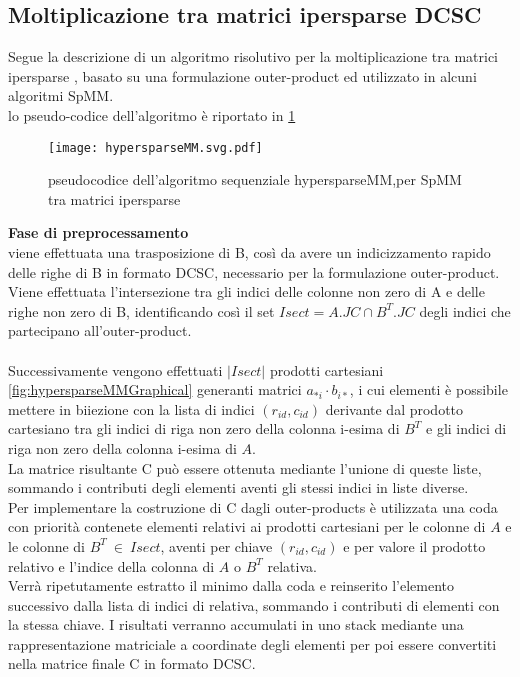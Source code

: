 \subsection{Moltiplicazione tra matrici ipersparse DCSC}
\label{ssec:hypersparseMM}
Segue la descrizione di un algoritmo risolutivo per la moltiplicazione tra matrici
ipersparse \cite{2dNewIdeas}, basato su una formulazione outer-product ed
utilizzato in alcuni algoritmi SpMM.\\
lo pseudo-codice dell'algoritmo è riportato in \ref{figCode:hypersparseMM} 
\begin{figure}[H]
  \centering \texttt{[image: hypersparseMM.svg.pdf]}
  \caption[pseudocodice hypersparseMM]{pseudocodice dell'algoritmo sequenziale hypersparseMM,per SpMM tra matrici ipersparse} 
  \decoRule \label{figCode:hypersparseMM}
\end{figure}

{\bf {Fase di preprocessamento}} \\
viene effettuata una trasposizione di B, così da avere un indicizzamento rapido delle righe di B
in formato DCSC, necessario per la
formulazione outer-product.\\ 
Viene effettuata l'intersezione tra gli indici delle colonne non zero di A e
delle righe non zero di B, identificando così il set $Isect = A.JC \cap B^T.JC$ degli
indici che partecipano all'outer-product.\\
\\
Successivamente vengono effettuati $|Isect|$ prodotti cartesiani \ref{fig:hypersparseMMGraphical} 
generanti matrici $a_{*i} \cdot b_{i*}$, i cui elementi è possibile mettere in biiezione 
con la lista di indici $(r_{id},c_{id})$ derivante dal prodotto cartesiano tra gli indici
di riga non zero della colonna i-esima di $B^T$ e gli indici di riga non zero 
della colonna i-esima di $A$.\\
La matrice risultante C può essere ottenuta mediante l'unione di queste liste,
sommando i contributi degli elementi aventi gli stessi indici in liste
diverse.\\
Per implementare la costruzione di C dagli outer-products
è utilizzata una coda con priorità contenete elementi relativi ai
prodotti cartesiani per le colonne di $A$ e le colonne di $B^T ~\in~ Isect$, 
aventi per chiave $(r_{id},c_{id})$ e per valore il prodotto relativo e l'indice
della colonna di $A$ o $B^T$ relativa.\\
Verrà ripetutamente estratto il minimo dalla coda e reinserito
l'elemento successivo dalla lista di indici di relativa, sommando i
contributi di elementi con la stessa chiave.
I risultati verranno accumulati in uno stack mediante una rappresentazione
matriciale a coordinate degli elementi %
per poi essere convertiti nella matrice finale C in formato DCSC.\\

